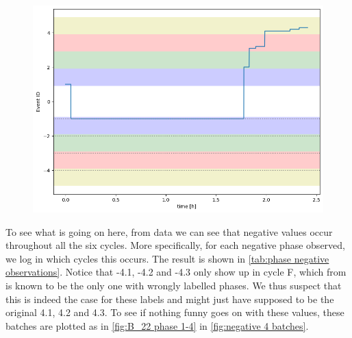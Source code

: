 \documentclass[../Thesis.tex]{subfiles}
\begin{document}
\begin{figure}[h]
    \centering
    \includegraphics[width=.7\linewidth]{figures/Multiple cycles data/Adding of solids/B_22 long waiting.png}
    \caption{}
    \label{fig:B_22 phase 1-4}
\end{figure}

To see what is going on here, from data we can see that negative values occur throughout all the six cycles. More specifically, for each negative phase observed, we log in which cycles this occurs. The result is shown in \autoref{tab:phase negative observations}. Notice that -4.1, -4.2 and -4.3 only show up in cycle F, which from \cite{benchmark-model-to-generate-batch-process-data} is known to be the only one with wrongly labelled phases. We thus suspect that this is indeed the case for these labels and might just have supposed to be the original 4.1, 4.2 and 4.3. To see if nothing funny goes on with these values, these batches are plotted as in \autoref{fig:B_22 phase 1-4} in \autoref{fig:negative 4 batches}.
\end{document}
